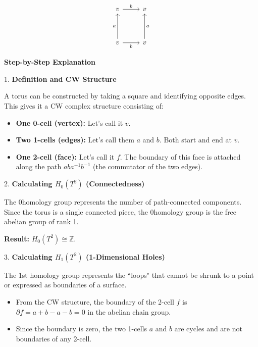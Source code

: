 \documentclass[12pt,a4paper]{report}
\begin{document}
\begin{description}
\[\begin{tikzcd}[row sep=huge]
		v \arrow[r, "b"] & v \\
		v \arrow[u, "a" ] \arrow[r, swap, "b"] & 
		v \arrow[u, swap, "a"]
	\end{tikzcd}\]

\begin{description}

\item \textbf{Step-by-Step Explanation}

\begin{description}

\item 1. \textbf{Definition and CW Structure}

A torus can be constructed by taking a square and identifying opposite edges. This gives it a CW complex structure consisting of:
\begin{itemize}

\item  \textbf{One 0-cell (vertex):} Let's call it $v$.
\item  \textbf{Two 1-cells (edges):} Let's call them $a$ and $b$. Both start and end at $v$.
\item  \textbf{One 2-cell (face):} Let's call it $f$. The boundary of this face is attached along the path $aba^{-1}b^{-1}$ (the commutator of the two edges).

\end{itemize}
\item 2. \textbf{Calculating $H_0(T^2)$ (Connectedness)}

The 0\ITH homology group represents the number of path-connected components. Since the torus is a single connected piece, the 0\ITH  homology group is the free abelian group of rank 1.

\textbf{Result:} $H_0(T^2) \cong \mathbb{Z}$.

\item 3. \textbf{Calculating $H_1(T^2)$ (1-Dimensional Holes)}

The 1st homology group represents the ``loops" that cannot be shrunk to a point or expressed as boundaries of a surface. 

\begin{itemize}
\item  From the CW structure, the boundary of the 2-cell $f$ is $\partial f = a + b - a - b = 0$ in the abelian chain group.

\item  Since the boundary is zero, the two 1-cells $a$ and $b$ are cycles and are not boundaries of any 2-cell.


\end{itemize}
\end{description}
\end{description}
\end{description}
\end{document}
